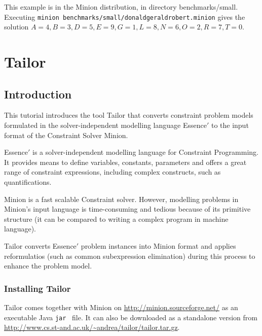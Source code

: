 \documentclass[oneside]{book}
\begin{document}
This example is in the Minion distribution, in directory benchmarks/small.
Executing \texttt{minion benchmarks/small/donaldgeraldrobert.minion}
gives the solution $A=4, B=3, D=5, E=9, G=1,
L=8, N=6, O=2, R=7, T=0.$

\chapter{Tailor}

\section{Introduction}
This tutorial introduces the tool {\sc Tailor} that 
converts constraint problem models formulated in the solver-independent modelling language 
{\sc Essence}$'$ to the input format of the Constraint Solver
{\sc Minion}. 

{\sc Essence}$'$ is a solver-independent modelling 
language for Constraint Programming. It provides means to define 
variables, constants, parameters and offers a great range of 
constraint expressions, including complex constructs, 
such as quantifications.

{\sc Minion} is a fast scalable Constraint solver. 
However, modelling problems in {\sc Minion}'s input
language is time-consuming and tedious because of its 
primitive structure (it can be compared to writing a 
complex program in machine language).

{\sc Tailor} converts {\sc Essence}$'$ problem instances
into {\sc Minion} format and applies reformulatios  
(such as common subexpression elimination) during this 
process to enhance the problem model.

\subsection{Installing {\sc Tailor}}
{\sc Tailor} comes together with {\sc Minion} on
\url{http://minion.sourceforge.net/} as an executable 
Java {\tt jar}~ file. It can also be downloaded
as a standalone version from 
\url{http://www.cs.st-and.ac.uk/~andrea/tailor/tailor.tar.gz}.
\end{document}
